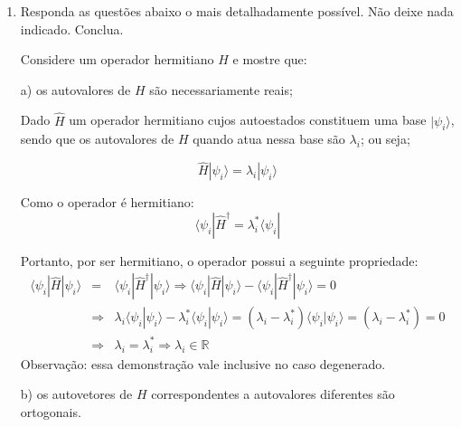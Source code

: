 \begin{enumerate}[start=1,label={\bfseries Q\arabic*.}]
\item Responda as questões abaixo o mais detalhadamente possível. Não deixe nada indicado. Conclua.

Considere um operador hermitiano $H$ e mostre que:

a) os autovalores de $H$ são necessariamente reais;

\resposta Dado $\hat{H}$ um operador hermitiano cujos autoestados constituem uma base $| \psi_{i} \rangle$, sendo que os autovalores de $H$ quando atua nessa base são $\lambda_{i}$; ou seja;

\begin{equation}
  \hat{H} |\psi_{i} \rangle = \lambda_{i} |\psi_{i} \rangle
\end{equation}

Como o operador é hermitiano:
\begin{equation}
  \langle  \psi_{i} | \hat{H}^{\dagger} = \lambda_{i}^{\ast} \langle \psi_{i} |
\end{equation}

Portanto, por ser hermitiano, o operador possui a seguinte propriedade:
%
\begin{equation}
\begin{array}{ccl}
  \langle \psi_{i} | \hat{H} | \psi_{i} \rangle & = & \langle \psi_{i} | \hat{H}^{\dagger} | \psi_{i} \rangle \Rightarrow
 \langle \psi_{i} | \hat{H} | \psi_{i} \rangle - \langle \psi_{i} | \hat{H}^{\dagger} | \psi_{i} \rangle = 0 \\
   &  \Rightarrow  & \lambda_{i} \langle \psi_{i} | \psi_{i} \rangle - \lambda_{i}^{\ast} \langle \psi_{i} | \psi_{i} \rangle = (\lambda_{i} - \lambda_{i}^{\ast}) \langle \psi_{i} | \psi_{i} \rangle = (\lambda_{i} - \lambda_{i}^{\ast}) = 0 \\
   & \Rightarrow &\lambda_{i} = \lambda_{i}^{\ast} \Rightarrow \lambda_{i} \in \mathbb{R}
\end{array}
\end{equation}
%
Observação: essa demonstração vale inclusive no caso degenerado.

b) os autovetores de $H$ correspondentes a autovalores diferentes são ortogonais.


\end{enumerate}
